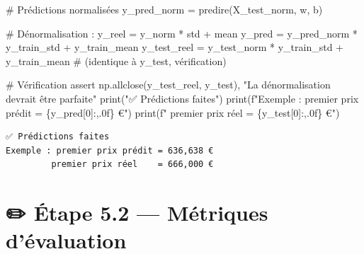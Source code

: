 \documentclass[
  french,
  11pt,
  a4paper,
]{scrbook}
\newenvironment{Shaded}{}{}
\newcommand{\BuiltInTok}[1]{\textcolor[rgb]{0.84,0.23,0.29}{#1}}
\newcommand{\CommentTok}[1]{\textcolor[rgb]{0.42,0.45,0.49}{#1}}
\newcommand{\ControlFlowTok}[1]{\textcolor[rgb]{0.84,0.23,0.29}{#1}}
\newcommand{\DecValTok}[1]{\textcolor[rgb]{0.00,0.36,0.77}{#1}}
\newcommand{\NormalTok}[1]{\textcolor[rgb]{0.14,0.16,0.18}{#1}}
\newcommand{\OperatorTok}[1]{\textcolor[rgb]{0.14,0.16,0.18}{#1}}
\newcommand{\SpecialCharTok}[1]{\textcolor[rgb]{0.00,0.36,0.77}{#1}}
\newcommand{\SpecialStringTok}[1]{\textcolor[rgb]{0.01,0.18,0.38}{#1}}
\newcommand{\StringTok}[1]{\textcolor[rgb]{0.01,0.18,0.38}{#1}}
\begin{document}
\begin{tcolorbox}[enhanced jigsaw, arc=.35mm, bottomrule=.15mm, bottomtitle=1mm, breakable, colback=white, colbacktitle=quarto-callout-tip-color!10!white, colframe=quarto-callout-tip-color-frame, coltitle=black, left=2mm, leftrule=.75mm, opacityback=0, opacitybacktitle=0.6, rightrule=.15mm, title=\textcolor{quarto-callout-tip-color}{\faLightbulb}\hspace{0.5em}{✅ Corrigé Étape 5.1}, titlerule=0mm, toprule=.15mm, toptitle=1mm]

\begin{Shaded}
\begin{Highlighting}[]
\CommentTok{\# Prédictions normalisées}
\NormalTok{y\_pred\_norm }\OperatorTok{=}\NormalTok{ predire(X\_test\_norm, w, b)}

\CommentTok{\# Dénormalisation : y\_reel = y\_norm * std + mean}
\NormalTok{y\_pred }\OperatorTok{=}\NormalTok{ y\_pred\_norm }\OperatorTok{*}\NormalTok{ y\_train\_std }\OperatorTok{+}\NormalTok{ y\_train\_mean}
\NormalTok{y\_test\_reel }\OperatorTok{=}\NormalTok{ y\_test\_norm }\OperatorTok{*}\NormalTok{ y\_train\_std }\OperatorTok{+}\NormalTok{ y\_train\_mean  }\CommentTok{\# (identique à y\_test, vérification)}

\CommentTok{\# Vérification}
\ControlFlowTok{assert}\NormalTok{ np.allclose(y\_test\_reel, y\_test), }\StringTok{"La dénormalisation devrait être parfaite"}
\BuiltInTok{print}\NormalTok{(}\StringTok{"✅ Prédictions faites"}\NormalTok{)}
\BuiltInTok{print}\NormalTok{(}\SpecialStringTok{f"Exemple : premier prix prédit = }\SpecialCharTok{\{}\NormalTok{y\_pred[}\DecValTok{0}\NormalTok{]}\SpecialCharTok{:,.0f\}}\SpecialStringTok{ €"}\NormalTok{)}
\BuiltInTok{print}\NormalTok{(}\SpecialStringTok{f"         premier prix réel    = }\SpecialCharTok{\{}\NormalTok{y\_test[}\DecValTok{0}\NormalTok{]}\SpecialCharTok{:,.0f\}}\SpecialStringTok{ €"}\NormalTok{)}
\end{Highlighting}
\end{Shaded}

\begin{verbatim}
✅ Prédictions faites
Exemple : premier prix prédit = 636,638 €
         premier prix réel    = 666,000 €
\end{verbatim}

\end{tcolorbox}

\section{✏️ Étape 5.2 --- Métriques
d'évaluation}\label{uxe9tape-5.2-muxe9triques-duxe9valuation}
\end{document}
